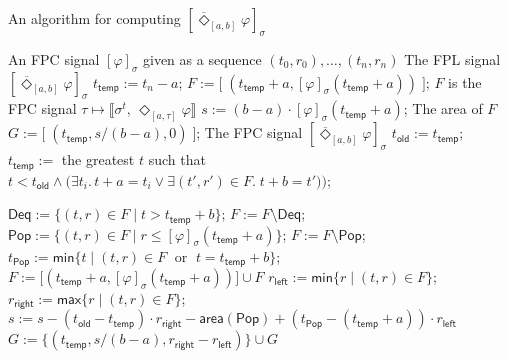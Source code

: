 \documentclass[envcountsect,orivec]{llncs} \usepackage{etex} \usepackage[]{graphicx}
\newcommand{\DiaOp}[1]{\Diamond_{#1}}
\newcommand{\TDiaOp}[1]{\overline{\Diamond}_{#1}}
\newcommand{\Robust}[2]{{ \llbracket #1,\, #2 \rrbracket}}
\newcommand{\Max}{\mathsf{max}}
\newcommand{\Min}{\mathsf{min}}
\begin{document}
\begin{algorithm}[tbp]
  \caption{An algorithm for computing $[\TDiaOp{[a,b]} \varphi]_{\sigma}$}
  \label{algo:tdia}
  \begin{algorithmic}
    \Require An FPC signal $[\varphi]_{\sigma}$
    given as a sequence $(t_{0},r_{0}),\dotsc,(t_{n},r_{n})$ 
\Ensure The FPL signal
$[\TDiaOp{[a,b]} \varphi]_{\sigma}$
    \State $t_{\mathsf{temp}} := t_n - a$;
    \State $F := \bigl[ \;(t_{\mathsf{temp}}+a, [\varphi]_{\sigma}(t_{\mathsf{temp}} + a)) \;\bigr]$; 
    \Comment $F$ is the FPC signal $\tau \mapsto \Robust{\sigma^t}{\DiaOp{[a,\tau]}\varphi}$
\State $s := (b-a) \cdot [\varphi]_{\sigma}(t_{\mathsf{temp}} + a)$;
    \Comment The area of $F$
    \State $G := \bigl[ \;(t_{\mathsf{temp}}, s / (b-a), 0) \;\bigr]$; 
    \Comment The FPC signal $[\TDiaOp{[a,b]} \varphi]_{\sigma}$
    \State $t_{\mathsf{old}} := t_{\mathsf{temp}}$;
    \State $t_{\mathsf{temp}} :=$ the greatest $t$ such that 
    $t < t_{\mathsf{old}} \wedge \bigl(\exists t_i.\, t + a = t_i \vee \exists (t', r') \in F. \; t+ b = t') \bigr)$;

    \State $\mathsf{Deq} := \{(t, r) \in F \mid t > t_{\mathsf{temp}} + b\}$; \quad $F := F \setminus \mathsf{Deq}$;
\State $\mathsf{Pop} := \{(t, r) \in F \mid r \leq  [\varphi]_{\sigma}(t_{\mathsf{temp}} + a) \}$; \quad $F := F \setminus \mathsf{Pop}$;
    \State $t_{\mathsf{Pop}} := \mathsf{min} \{t \mid(t,r) \in F \; \text{ or } \; t = t_{\mathsf{temp}} + b\}$; 
    \State $F := \big[ (t_{\mathsf{temp}}+a,  [\varphi]_{\sigma}(t_{\mathsf{temp}} + a))\big] \cup F$ 
    \State $r_{\mathsf{left}} := \Min\{ r \mid (t,r) \in F \}$;
    \State $r_{\mathsf{right}} := \Max\{ r \mid (t,r) \in F \}$;
    \State $s := s
    - (t_{\mathsf{old}} - t_{\mathsf{temp}}) \cdot r_{\mathsf{right}} 
    - \mathsf{area}(\mathsf{Pop}) 
    + (t_{\mathsf{Pop}} - (t_{\mathsf{temp}} +a )) \cdot r_{\mathsf{left}}$
\State $G := \{(t_{\mathsf{temp}}, s/(b-a),r_{\mathsf{right}} - r_{\mathsf{left}})\} \cup G$
\EndWhile
  \end{algorithmic}
\end{algorithm}
\end{document}
